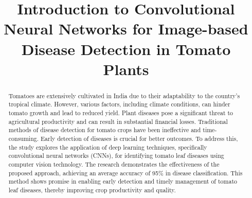 \documentclass[conference]{IEEEtran}
\begin{document}
\title{Introduction to Convolutional Neural Networks for Image-based Disease Detection in Tomato Plants}

\author{
\and
{}
}


\maketitle

\begin{abstract}

Tomatoes are extensively cultivated in India due to their adaptability to the country's tropical climate. However, various factors, including climate conditions, can hinder tomato growth and lead to reduced yield. Plant diseases pose a significant threat to agricultural productivity and can result in substantial financial losses. Traditional methods of disease detection for tomato crops have been ineffective and time-consuming. Early detection of diseases is crucial for better outcomes. To address this, the study explores the application of deep learning techniques, specifically convolutional neural networks (CNNs), for identifying tomato leaf diseases using computer vision technology. The research demonstrates the effectiveness of the proposed approach, achieving an average accuracy of 95\% in disease classification. This method shows promise in enabling early detection and timely management of tomato leaf diseases, thereby improving crop productivity and quality. \\

 
\end{abstract}
\end{document}
